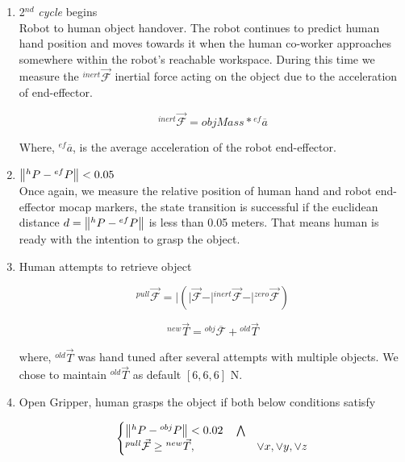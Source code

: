 \begin{enumerate}[start=0,label={\bf{t}\arabic*:}]
    \item 2$^{nd}$ \textit{cycle} begins\\
    Robot to human object handover. The robot continues to predict human hand position and moves towards it when the human co-worker approaches somewhere within the robot's reachable workspace. During this time we measure the ${}^{inert}\vec{\mathcal{F}}$ inertial force acting on the object due to the acceleration of end-effector.

    \begin{equation}
        {}^{inert}\vec{\mathcal{F}}  = objMass * {}^{ef}\overline{a}
    \end{equation}

    Where, ${}^{ef}\overline{a}$, is the average acceleration of the robot end-effector.

    \item $\norm{{}^h{P} - {}^{ef}{P}} < 0.05$\\
    Once again, we measure the relative position of human hand and robot end-effector mocap markers, the state transition is successful if the euclidean distance $d = \norm{{}^h{P} - {}^{ef}{P}}$ is less than 0.05 meters. That means human is ready with the intention to grasp the object.
    
    \item Human attempts to retrieve object
    
    \begin{equation}
    {}^{pull}\vec{\mathcal{F}} = \vert{ (\vert{\vec{\mathcal{F}}} - \vert{{}^{inert}\vec{\mathcal{F}}} - \vert{{}^{zero}\vec{\mathcal{F}}}) }
    \end{equation}
    
    \begin{equation}
    {}^{new}\vec{T} = {}^{obj}\overline{\mathcal{F}} + {}^{old}\vec{T}
    \end{equation}
    
    where, ${}^{old}\vec{T}$ was hand tuned after several attempts with multiple objects. We chose to maintain ${}^{old}\vec{T}$ as default $[6, 6, 6]$ N. 
    
    \item Open Gripper, human grasps the object if both below conditions satisfy

    \begin{equation}\label{Fpull}
    \begin{cases}
     \norm{{}^h{P} - {}^{obj}{P}} < 0.02 \quad \bigwedge  \\
     {}^{pull}\vec{\mathcal{F}}\geq {}^{new}\vec{T}, & \lor x, \lor y, \lor z
   \end{cases}
   \end{equation}


\end{enumerate}
